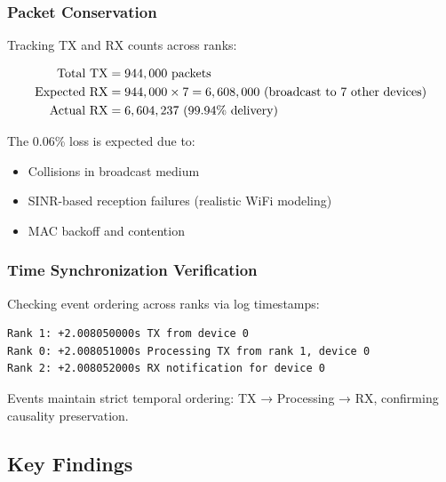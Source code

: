 \subsubsection{Packet Conservation}

Tracking TX and RX counts across ranks:

\begin{align}
\text{Total TX} &= 944,000 \text{ packets} \notag \\
\text{Expected RX} &= 944,000 \times 7 = 6,608,000 \text{ (broadcast to 7 other devices)} \notag \\
\text{Actual RX} &= 6,604,237 \text{ (99.94\% delivery)} \notag
\end{align}

The 0.06\% loss is expected due to:
\begin{itemize}
    \item Collisions in broadcast medium
    \item SINR-based reception failures (realistic WiFi modeling)
    \item MAC backoff and contention
\end{itemize}

\subsubsection{Time Synchronization Verification}

Checking event ordering across ranks via log timestamps:

\begin{verbatim}
Rank 1: +2.008050000s TX from device 0
Rank 0: +2.008051000s Processing TX from rank 1, device 0
Rank 2: +2.008052000s RX notification for device 0
\end{verbatim}

Events maintain strict temporal ordering: TX → Processing → RX, confirming causality preservation.

\subsection{Key Findings}

